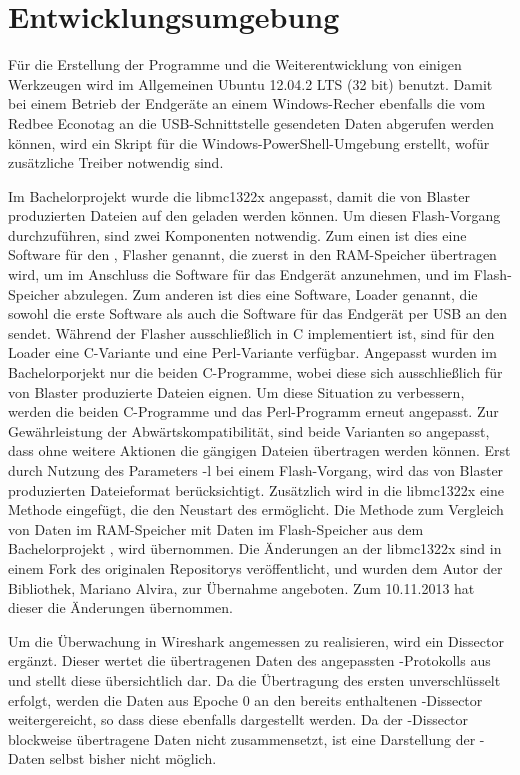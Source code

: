 \section{Entwicklungsumgebung}
\label{sec:entwicklungsumgebung}

Für die Erstellung der Programme und die Weiterentwicklung von einigen Werkzeugen wird im Allgemeinen Ubuntu 12.04.2 LTS (32 bit) benutzt.
Damit bei einem Betrieb der Endgeräte an einem Windows-Recher ebenfalls die vom Redbee Econotag an die USB-Schnittstelle gesendeten
Daten abgerufen werden können, wird ein Skript für die Windows-PowerShell-Umgebung erstellt, wofür zusätzliche Treiber notwendig sind.

Im Bachelorprojekt  wurde die libmc1322x \cite{libmc1322x} angepasst, damit die von Blaster produzierten Dateien auf den
 geladen werden können. Um diesen Flash-Vorgang durchzuführen, sind zwei Komponenten notwendig. Zum einen ist dies eine
Software für den , Flasher genannt, die zuerst in den RAM-Speicher übertragen wird, um im Anschluss die Software für
das Endgerät anzunehmen, und im Flash-Speicher abzulegen. Zum anderen ist dies eine Software, Loader genannt, die sowohl die erste
Software als auch die Software für das Endgerät per USB an den  sendet. Während der Flasher ausschließlich in C
implementiert ist, sind für den Loader eine C-Variante und eine Perl-Variante verfügbar. Angepasst wurden im Bachelorporjekt 
nur die beiden C-Programme, wobei diese sich ausschließlich für von Blaster produzierte Dateien eignen. Um diese Situation zu verbessern,
werden die beiden C-Programme und das Perl-Programm erneut angepasst. Zur Gewährleistung der Abwärtskompatibilität, sind beide Varianten
so angepasst, dass ohne weitere Aktionen die gängigen Dateien übertragen werden können. Erst durch Nutzung des Parameters -l bei einem
Flash-Vorgang, wird das von Blaster produzierten Dateieformat berücksichtigt. Zusätzlich wird in die libmc1322x eine Methode eingefügt,
die den Neustart des  ermöglicht. Die Methode zum Vergleich von Daten im RAM-Speicher mit Daten im Flash-Speicher aus dem
Bachelorprojekt , wird übernommen. Die Änderungen an der libmc1322x sind in einem Fork des originalen Repositorys veröffentlicht,
und wurden dem Autor der Bibliothek, Mariano Alvira, zur Übernahme angeboten. Zum 10.11.2013 hat dieser die Änderungen übernommen.

Um die Überwachung in Wireshark \cite{wireshark} angemessen zu realisieren, wird ein Dissector ergänzt. Dieser wertet die übertragenen
Daten des angepassten -Protokolls aus und stellt diese übersichtlich dar. Da die Übertragung des ersten 
unverschlüsselt erfolgt, werden die Daten aus Epoche 0 an den bereits enthaltenen -Dissector weitergereicht, so dass
diese ebenfalls dargestellt werden. Da der -Dissector blockweise übertragene Daten nicht zusammensetzt, ist eine Darstellung
der -Daten selbst bisher nicht möglich.

